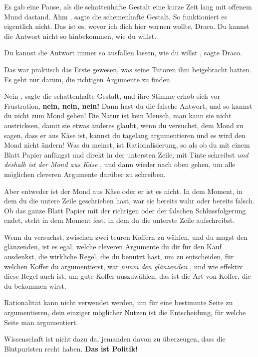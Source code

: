 Es gab eine Pause, als die schattenhafte Gestalt eine kurze Zeit lang mit
offenem Mund dastand. \glqq Ähm\grqq{} , sagte die schemenhafte Gestalt. \glqq
So funktioniert es eigentlich nicht. Das ist es, wovor ich dich hier warnen
wollte, Draco. Du kannst die Antwort nicht so hinbekommen, wie du willst.\grqq{}

\glqq Du kannst die Antwort immer so ausfallen lassen, wie du willst\grqq{} ,
sagte Draco.

Das war praktisch das Erste gewesen, was seine Tutoren ihm beigebracht hatten.
\glqq Es geht nur darum, die richtigen Argumente zu finden.\grqq{}

\glqq Nein\grqq{} , sagte die schattenhafte Gestalt, und ihre Stimme erhob sich
vor Frustration, \glqq \textbf{nein, nein, nein!} Dann hast du die falsche
Antwort, und so kannst du nicht zum Mond gehen! Die Natur ist kein Mensch, man
kann sie nicht austricksen, damit sie etwas anderes glaubt, wenn du versuchst,
dem Mond zu sagen, dass er aus Käse ist, kannst du tagelang argumentieren und es
wird den Mond nicht ändern! Was du meinst, ist Rationalisierung, so als ob du
mit einem Blatt Papier anfängst und direkt in der untersten Zeile, mit Tinte
schreibst \emph{\glqq und deshalb ist der Mond aus Käse\grqq{} }, und dann
wieder nach oben gehen, um alle möglichen cleveren Argumente darüber zu
schreiben.

Aber entweder ist der Mond aus Käse oder er ist es nicht. In dem Moment, in dem
du die untere Zeile geschrieben hast, war sie bereits wahr oder bereits falsch.
Ob das ganze Blatt Papier mit der richtigen oder der falschen Schlussfolgerung
endet, steht in dem Moment fest, in dem du die unterste Zeile aufschreibst.

Wenn du versuchst, zwischen zwei teuren Koffern zu wählen, und du magst den
glänzenden, ist es egal, welche cleveren Argumente du dir für den Kauf
ausdenkst, die wirkliche Regel, die du benutzt hast, um zu entscheiden, für
welchen Koffer du argumentierst, war\emph{ \glqq nimm den glänzenden\grqq{} },
und wie effektiv diese Regel auch ist, um gute Koffer auszuwählen, das ist die
Art von Koffer, die du bekommen wirst.

Rationalität kann nicht verwendet werden, um für eine bestimmte Seite zu
argumentieren, dein einziger möglicher Nutzen ist die Entscheidung, für welche
Seite man argumentiert.

Wissenschaft ist nicht dazu da, jemanden davon zu überzeugen, dass die
Blutpuristen recht haben. \textbf{Das ist Politik!}

